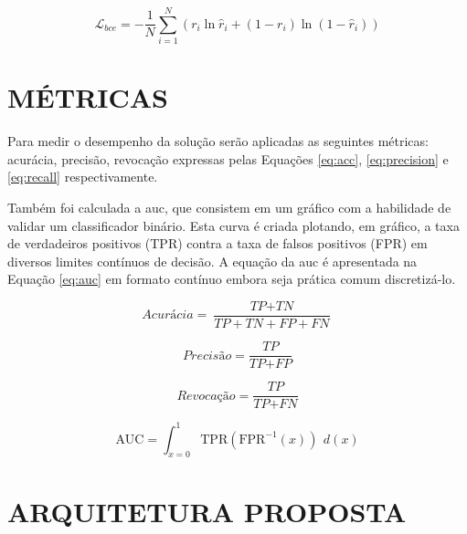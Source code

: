 \begin{equation}
\mathcal{L}_{bce} = -\frac{1}{N} \sum_{i=1}^N
(r_i \ln \hat{r}_i + (1 - r_i) \ln (1 - \hat{r}_i))
\label{eq:bce}
\end{equation}

\section{MÉTRICAS}
\label{subsec:cap4_metrics}
Para medir o desempenho da solução serão aplicadas as seguintes métricas: acurácia, precisão, revocação expressas pelas Equações \ref{eq:acc}, \ref{eq:precision} e \ref{eq:recall} respectivamente.

Também foi calculada a \gls{auc}, que consistem em um gráfico com a habilidade de validar um classificador binário. Esta curva é criada plotando, em gráfico, a taxa de verdadeiros positivos (TPR) contra a taxa de falsos positivos (FPR) em diversos limites contínuos de decisão. A equação da \gls{auc} é apresentada na Equação \ref{eq:auc} em formato contínuo embora seja prática comum discretizá-lo.


\begin{equation}
  \textit{Acurácia} = \frac{\textit{TP} + \textit{TN}}{\textit{TP} + \textit{TN} + \textit{FP} + \textit{FN}}
  \label{eq:acc}
\end{equation}

\begin{equation}
  \textit{Precisão} = \frac{\textit{TP}}{\textit{TP} + \textit{FP}}
  \label{eq:precision}
\end{equation}

\begin{equation}
  \textit{Revocação} = \frac{\textit{TP}}{\textit{TP} + \textit{FN}}
  \label{eq:recall}
\end{equation}

\begin{equation}
  \text{AUC} = \int_{x=0}^{1} \text{TPR}(\text{FPR}^{-1}(x)) \ \, d(x)
  \label{eq:auc}
\end{equation}

\section{ARQUITETURA PROPOSTA}
\label{subsec:cap4_architecture}


